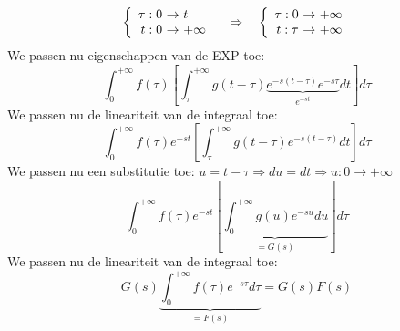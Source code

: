 \documentclass[]{subfiles}
\begin{document}
	\begin{equation}
		\left\{ \begin{array}{r@{\text{ $\rightarrow$ }}l}
			\tau:0&t \\
			 t:0&+\infty 
		\end{array}\right.\quad\Rightarrow\quad
	\left\{ \begin{array}{r@{\text{ $\rightarrow$ }}l}
		\tau:0&+\infty\\
		t:\tau&+\infty 
	\end{array}\right.
	\end{equation}
	We passen nu eigenschappen van de EXP toe:
	\begin{equation}
		\int_{0}^{+\infty}f(\tau)\left[ \int_{\tau}^{+\infty}g(t-\tau)\underbrace{e^{-s(t-\tau)}e^{-s\tau}}_{e^{-st}}dt\right]d\tau 
	\end{equation}
	We passen nu de lineariteit van de integraal toe:
	\begin{equation}
		\int_{0}^{+\infty}f(\tau)e^{-st}\left[ \int_{\tau}^{+\infty}g(t-\tau)e^{-s(t-\tau)}dt\right] d\tau
	\end{equation}
	We passen nu een substitutie toe: $u = t-\tau  \Rightarrow du = dt \Rightarrow u: 0\rightarrow+\infty$
	\begin{equation}
		\int_{0}^{+\infty}f(\tau)e^{-st}\left[ \underbrace{\int_{0}^{+\infty}g(u)e^{-su}du}_{=G(s)}\right] d\tau
	\end{equation}
	We passen nu de lineariteit van de integraal toe:
	\begin{equation}
		G(s)\underbrace{\int_{0}^{+\infty}f(\tau)e^{-s\tau}d\tau}_{=F(s)}=G(s)F(s)
	\end{equation}
\end{document}
